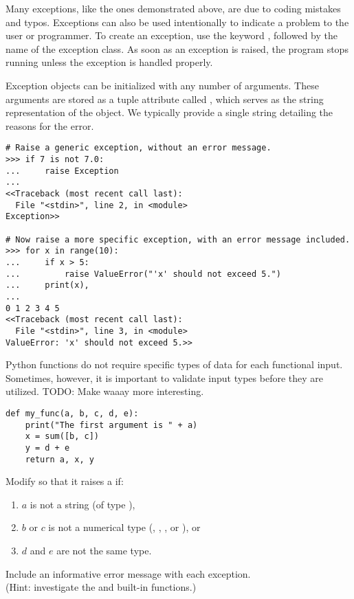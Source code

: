Many exceptions, like the ones demonstrated above, are due to coding mistakes and typos.
Exceptions can also be used intentionally to indicate a problem to the user or programmer.
To create an exception, use the keyword , followed by the name of the exception class.
As soon as an exception is raised, the program stops running unless the exception is handled properly.

Exception objects can be initialized with any number of arguments.
These arguments are stored as a tuple attribute called , which serves as the string representation of the object.
We typically provide a single string detailing the reasons for the error.

\begin{lstlisting}
# Raise a generic exception, without an error message.
>>> if 7 is not 7.0:
...     raise Exception
... 
<<Traceback (most recent call last):
  File "<stdin>", line 2, in <module>
Exception>>

# Now raise a more specific exception, with an error message included.
>>> for x in range(10):
...     if x > 5:
...         raise ValueError("'x' should not exceed 5.")
...     print(x),
... 
0 1 2 3 4 5
<<Traceback (most recent call last):
  File "<stdin>", line 3, in <module>
ValueError: 'x' should not exceed 5.>>
\end{lstlisting}

\begin{problem} %
Python functions do not require specific types of data for each functional input.
Sometimes, however, it is important to validate input types before they are utilized. TODO: Make  waaay more interesting.
\begin{lstlisting}
def my_func(a, b, c, d, e):
    print("The first argument is " + a)
    x = sum([b, c])
    y = d + e
    return a, x, y
\end{lstlisting}
Modify  so that it raises a  if:
\begin{enumerate}
\item $a$ is not a string (of type ),
\item $b$ or $c$ is not a numerical type (, , , or ), or
\item $d$ and $e$ are not the same type.
\end{enumerate}
Include an informative error message with each exception.
\\
(Hint: investigate the  and  built-in functions.)
\end{problem}

